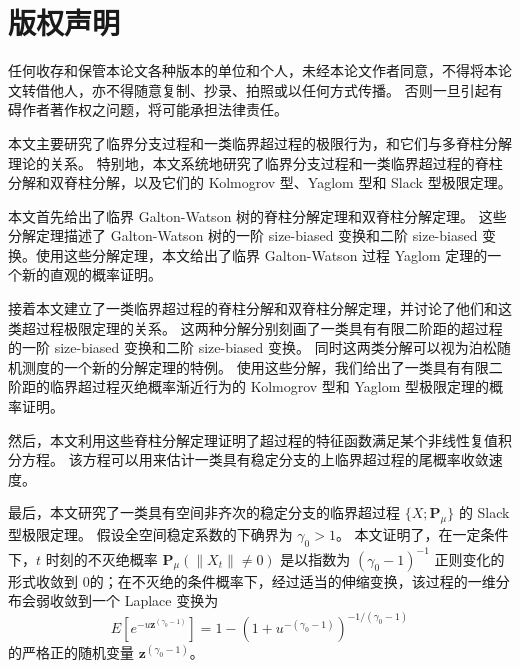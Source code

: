 \documentclass[UTF8]{pkuthss}
\theoremstyle{plain}
\theoremstyle{definition}
\numberwithin{equation}{section}
\begin{document}
\frontmatter
\pagestyle{empty}
\maketitle
\cleardoublepage
\chapter*{版权声明}
\thispagestyle{empty}
	任何收存和保管本论文各种版本的单位和个人，未经本论文作者同意，不得将本论文转借他人，亦不得随意复制、抄录、拍照或以任何方式传播。
	否则一旦引起有碍作者著作权之问题，将可能承担法律责任。
\cleardoublepage
\pagestyle{plain}
\setcounter{page}{0}
\begin{cabstract}
	本文主要研究了临界分支过程和一类临界超过程的极限行为，和它们与多脊柱分解理论的关系。
	特别地，本文系统地研究了临界分支过程和一类临界超过程的脊柱分解和双脊柱分解，以及它们的 Kolmogrov 型、Yaglom 型和 Slack 型极限定理。

	本文首先给出了临界 Galton-Watson 树的脊柱分解定理和双脊柱分解定理。
	这些分解定理描述了 Galton-Watson 树的一阶 size-biased 变换和二阶 size-biased 变换。使用这些分解定理，本文给出了临界 Galton-Watson 过程 Yaglom 定理的一个新的直观的概率证明。
	
	接着本文建立了一类临界超过程的脊柱分解和双脊柱分解定理，并讨论了他们和这类超过程极限定理的关系。
	这两种分解分别刻画了一类具有有限二阶距的超过程的一阶 size-biased 变换和二阶 size-biased 变换。
	同时这两类分解可以视为泊松随机测度的一个新的分解定理的特例。
	使用这些分解，我们给出了一类具有有限二阶距的临界超过程灭绝概率渐近行为的 Kolmogrov 型和 Yaglom 型极限定理的概率证明。
	
	然后，本文利用这些脊柱分解定理证明了超过程的特征函数满足某个非线性复值积分方程。
	该方程可以用来估计一类具有稳定分支的上临界超过程的尾概率收敛速度。
	
	最后，本文研究了一类具有空间非齐次的稳定分支的临界超过程 $\{X;\mathbf P_\mu\}$ 的 Slack 型极限定理。
	假设全空间稳定系数的下确界为 $\gamma_0 > 1$。
	本文证明了，在一定条件下，$t$ 时刻的不灭绝概率 $\mathbf P_{\mu}(\|X_t\|\neq 0)$ 是以指数为 $(\gamma_0-1)^{-1}$ 正则变化的形式收敛到 $0$的；在不灭绝的条件概率下，经过适当的伸缩变换，该过程的一维分布会弱收敛到一个 Laplace 变换为
\[
	E[e^{-u\mathbf z^{(\gamma_0-1)}}]=1-(1+u^{-(\gamma_0-1)})^{-1/(\gamma_0-1)}
\]
	的严格正的随机变量 $\mathbf z^{(\gamma_0-1)}$。
\end{cabstract}
\end{document}
